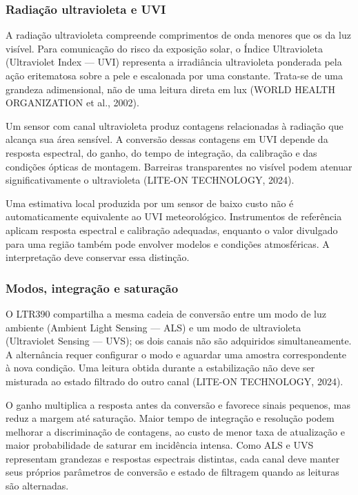 \documentclass{article}
\begin{document}
\subsubsection{Radia\c{c}\~ao ultravioleta e UVI}


A radia\c{c}\~ao ultravioleta compreende comprimentos de onda menores que os da luz vis\'ivel. Para comunica\c{c}\~ao do risco da exposi\c{c}\~ao solar, o \'Indice Ultravioleta (Ultraviolet Index --- UVI) representa a irradi\^ancia ultravioleta ponderada pela a\c{c}\~ao eritematosa sobre a pele e escalonada por uma constante. Trata-se de uma grandeza adimensional, n\~ao de uma leitura direta em lux (WORLD HEALTH ORGANIZATION et al., 2002).


Um sensor com canal ultravioleta produz contagens relacionadas \`a radia\c{c}\~ao que alcan\c{c}a sua \'area sens\'ivel. A convers\~ao dessas contagens em UVI depende da resposta espectral, do ganho, do tempo de integra\c{c}\~ao, da calibra\c{c}\~ao e das condi\c{c}\~oes \'opticas de montagem. Barreiras transparentes no vis\'ivel podem atenuar significativamente o ultravioleta (LITE-ON TECHNOLOGY, 2024).


Uma estimativa local produzida por um sensor de baixo custo n\~ao \'e automaticamente equivalente ao UVI meteorol\'ogico. Instrumentos de refer\^encia aplicam resposta espectral e calibra\c{c}\~ao adequadas, enquanto o valor divulgado para uma regi\~ao tamb\'em pode envolver modelos e condi\c{c}\~oes atmosf\'ericas. A interpreta\c{c}\~ao deve conservar essa distin\c{c}\~ao.


\subsubsection{Modos, integra\c{c}\~ao e satura\c{c}\~ao}


O LTR390 compartilha a mesma cadeia de convers\~ao entre um modo de luz ambiente (Ambient Light Sensing --- ALS) e um modo de ultravioleta (Ultraviolet Sensing --- UVS); os dois canais n\~ao s\~ao adquiridos simultaneamente. A altern\^ancia requer configurar o modo e aguardar uma amostra correspondente \`a nova condi\c{c}\~ao. Uma leitura obtida durante a estabiliza\c{c}\~ao n\~ao deve ser misturada ao estado filtrado do outro canal (LITE-ON TECHNOLOGY, 2024).


O ganho multiplica a resposta antes da convers\~ao e favorece sinais pequenos, mas reduz a margem at\'e satura\c{c}\~ao. Maior tempo de integra\c{c}\~ao e resolu\c{c}\~ao podem melhorar a discrimina\c{c}\~ao de contagens, ao custo de menor taxa de atualiza\c{c}\~ao e maior probabilidade de saturar em incid\^encia intensa. Como ALS e UVS representam grandezas e respostas espectrais distintas, cada canal deve manter seus pr\'oprios par\^ametros de convers\~ao e estado de filtragem quando as leituras s\~ao alternadas.
\end{document}

